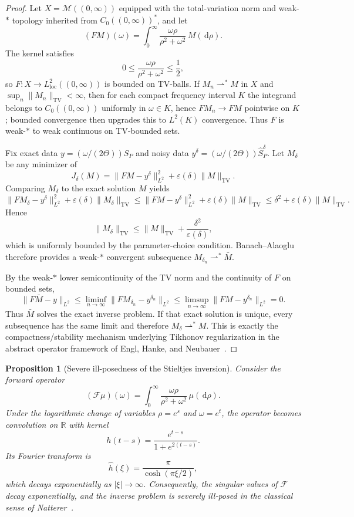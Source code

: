 \documentclass[11pt]{article}
\newtheorem{proposition}[theorem]{Proposition}
\newcommand{\R}{\mathbb{R}}
\newcommand{\TV}{\operatorname{TV}}
\newcommand{\dd}{\,\mathrm{d}}
\newcommand{\REV}{}
\begin{document}
\begin{proof}
\REV
Let $X=\mathcal M((0,\infty))$ equipped with the total-variation norm and weak-$*$ topology inherited from $C_0((0,\infty))^\ast$, and let
\[
  (FM)(\omega)=\int_0^\infty \frac{\omega\rho}{\rho^2+\omega^2}\,M(\dd\rho).
\]
The kernel satisfies
\[
  0\le \frac{\omega\rho}{\rho^2+\omega^2}\le \frac12,
\]
so $F:X\to L^2_{\mathrm{loc}}((0,\infty))$ is bounded on TV-balls. If $M_n\rightharpoonup^\ast M$ in $X$ and $\sup_n \|M_n\|_{\TV}<\infty$, then for each compact frequency interval $K$ the integrand belongs to $C_0((0,\infty))$ uniformly in $\omega\in K$, hence $FM_n\to FM$ pointwise on $K$; bounded convergence then upgrades this to $L^2(K)$ convergence. Thus $F$ is weak-$*$ to weak continuous on TV-bounded sets.

Fix exact data $y= (\omega /(2\Theta))S_P$ and noisy data $y^\delta=(\omega /(2\Theta))\widehat S_P^\delta$. Let $M_\delta$ be any minimizer of
\[
  J_\delta(M)=\|FM-y^\delta\|_{L^2}^2+\varepsilon(\delta)\|M\|_{\TV}.
\]
Comparing $M_\delta$ to the exact solution $M$ yields
\[
  \|FM_\delta-y^\delta\|_{L^2}^2+\varepsilon(\delta)\|M_\delta\|_{\TV}
  \le
  \|FM-y^\delta\|_{L^2}^2+\varepsilon(\delta)\|M\|_{\TV}
  \le
  \delta^2+\varepsilon(\delta)\|M\|_{\TV}.
\]
Hence
\[
  \|M_\delta\|_{\TV}\le \|M\|_{\TV}+\frac{\delta^2}{\varepsilon(\delta)},
\]
which is uniformly bounded by the parameter-choice condition. Banach--Alaoglu therefore provides a weak-$*$ convergent subsequence $M_{\delta_n}\rightharpoonup^\ast \bar M$.

By the weak-$*$ lower semicontinuity of the TV norm and the continuity of $F$ on bounded sets,
\[
  \|F\bar M-y\|_{L^2}
  \le
  \liminf_{n\to\infty}\|F M_{\delta_n}-y^{\delta_n}\|_{L^2}
  \le
  \limsup_{n\to\infty}\|FM-y^{\delta_n}\|_{L^2}
  =0.
\]
Thus $\bar M$ solves the exact inverse problem. If that exact solution is unique, every subsequence has the same limit and therefore $M_\delta\rightharpoonup^\ast M$. This is exactly the compactness/stability mechanism underlying Tikhonov regularization in the abstract operator framework of Engl, Hanke, and Neubauer~\cite[Chs.~3 and~10]{EnglHankeNeubauer1996}.
\end{proof}

\begin{proposition}[Severe ill-posedness of the Stieltjes inversion]\label{prop:severe-illposed}
Consider the forward operator
\[
  (\mathcal F\mu)(\omega)=\int_0^\infty \frac{\omega\rho}{\rho^2+\omega^2}\,\mu(\dd\rho).
\]
Under the logarithmic change of variables $\rho=e^s$ and $\omega=e^t$, the operator becomes convolution on $\R$ with kernel
\[
  h(t-s)=\frac{e^{t-s}}{1+e^{2(t-s)}}.
\]
Its Fourier transform is
\[
  \widehat h(\xi)=\frac{\pi}{\cosh(\pi\xi/2)},
\]
which decays exponentially as $|\xi|\to\infty$. Consequently, the singular values of $\mathcal F$ decay exponentially, and the inverse problem is severely ill-posed in the classical sense of Natterer~\cite{Natterer1984}.
\end{proposition}
\end{document}
